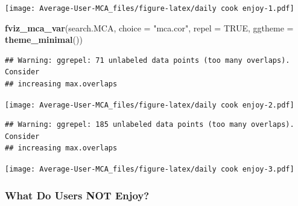 \documentclass[
]{article}
\newenvironment{Shaded}{\begin{snugshade}}{\end{snugshade}}
\newcommand{\DataTypeTok}[1]{\textcolor[rgb]{0.13,0.29,0.53}{#1}}
\newcommand{\KeywordTok}[1]{\textcolor[rgb]{0.13,0.29,0.53}{\textbf{#1}}}
\newcommand{\NormalTok}[1]{#1}
\newcommand{\OtherTok}[1]{\textcolor[rgb]{0.56,0.35,0.01}{#1}}
\newcommand{\StringTok}[1]{\textcolor[rgb]{0.31,0.60,0.02}{#1}}
\begin{document}
\texttt{[image: Average-User-MCA\_files/figure-latex/daily cook enjoy-1.pdf]}

\begin{Shaded}
\begin{Highlighting}[]
\KeywordTok{fviz_mca_var}\NormalTok{(search.MCA, }\DataTypeTok{choice =} \StringTok{"mca.cor"}\NormalTok{, }\DataTypeTok{repel =} \OtherTok{TRUE}\NormalTok{,}
             \DataTypeTok{ggtheme =} \KeywordTok{theme_minimal}\NormalTok{())}
\end{Highlighting}
\end{Shaded}

\begin{verbatim}
## Warning: ggrepel: 71 unlabeled data points (too many overlaps). Consider
## increasing max.overlaps
\end{verbatim}

\texttt{[image: Average-User-MCA\_files/figure-latex/daily cook enjoy-2.pdf]}

\begin{Shaded}
\end{Shaded}

\begin{verbatim}
## Warning: ggrepel: 185 unlabeled data points (too many overlaps). Consider
## increasing max.overlaps
\end{verbatim}

\texttt{[image: Average-User-MCA\_files/figure-latex/daily cook enjoy-3.pdf]}

\hypertarget{what-do-users-not-enjoy-4}{%
\subsubsection{What Do Users NOT
Enjoy?}\label{what-do-users-not-enjoy-4}}
\end{document}
